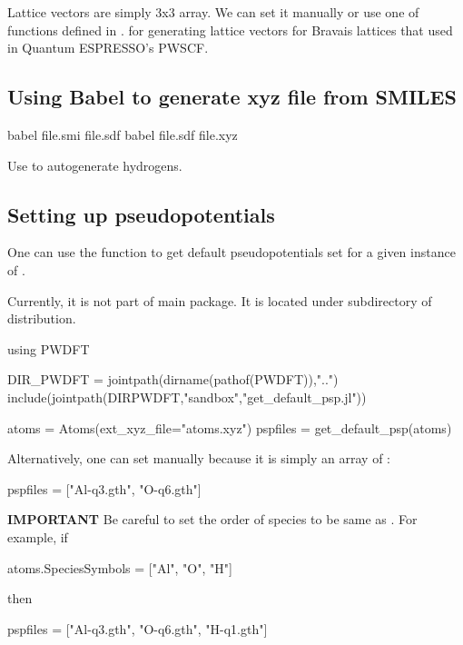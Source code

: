 Lattice vectors are simply 3x3 array. We can set it manually or use
one of functions defined in .
for generating lattice vectors for Bravais lattices that used
in Quantum ESPRESSO's PWSCF.

\subsection*{Using Babel to generate xyz file from SMILES}

\begin{textcode}
babel file.smi file.sdf
babel file.sdf file.xyz
\end{textcode}

Use  to autogenerate hydrogens.



\subsection*{Setting up pseudopotentials}

One can use the function  to get default
pseudopotentials set for a given instance of .

Currently, it is not part of main  package. It is located
under  subdirectory of  distribution.

\begin{juliacode}
using PWDFT

DIR_PWDFT = jointpath(dirname(pathof(PWDFT)),"..")
include(jointpath(DIRPWDFT,"sandbox","get_default_psp.jl"))

atoms = Atoms(ext_xyz_file="atoms.xyz")
pspfiles = get_default_psp(atoms)
\end{juliacode}

Alternatively, one can set  manually because it is simply
an array of :
\begin{juliacode}
pspfiles = ["Al-q3.gth", "O-q6.gth"]
\end{juliacode}

\textbf{IMPORTANT} Be careful to set the order of species to be same as
. For example, if
\begin{juliacode}
atoms.SpeciesSymbols = ["Al", "O", "H"]
\end{juliacode}
then
\begin{juliacode}
pspfiles = ["Al-q3.gth", "O-q6.gth", "H-q1.gth"]
\end{juliacode}


